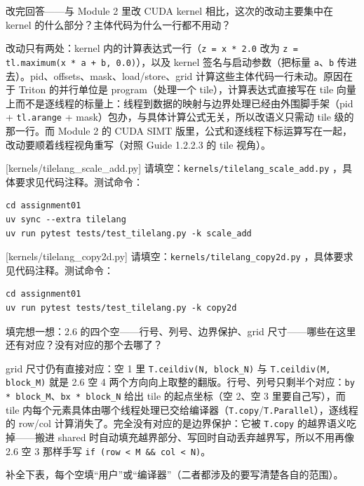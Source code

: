 \documentclass[11pt,a4paper,fontset=none]{ctexart}
\begin{document}
改完回答——与 Module 2 里改 CUDA kernel 相比，这次的改动主要集中在 kernel 的什么部分？主体代码为什么一行都不用动？

改动只有两处：kernel 内的计算表达式一行（\texttt{z = x * 2.0} 改为 \texttt{z = tl.maximum(x * a + b, 0.0)}），以及 kernel 签名与启动参数（把标量 \texttt{a}、\texttt{b} 传进去）。pid、offsets、mask、load/store、grid 计算这些主体代码一行未动。原因在于 Triton 的并行单位是 program（处理一个 tile），计算表达式直接写在 tile 向量上而不是逐线程的标量上：线程到数据的映射与边界处理已经由外围脚手架（pid + \texttt{tl.arange} + mask）包办，与具体计算公式无关，所以改语义只需动 tile 级的那一行。而 Module 2 的 CUDA SIMT 版里，公式和逐线程下标运算写在一起，改动要顺着线程视角重写（对照 Guide 1.2.2.3 的 tile 视角）。

[kernels/tilelang\_scale\_add.py]
请填空：\texttt{kernels/tilelang\_scale\_add.py} ，具体要求见代码注释。测试命令：

\begin{lstlisting}
cd assignment01
uv sync --extra tilelang
uv run pytest tests/test_tilelang.py -k scale_add
\end{lstlisting}

[kernels/tilelang\_copy2d.py]
请填空：\texttt{kernels/tilelang\_copy2d.py} ，具体要求见代码注释。测试命令：

\begin{lstlisting}
cd assignment01
uv run pytest tests/test_tilelang.py -k copy2d
\end{lstlisting}

填完想一想：2.6 的四个空——行号、列号、边界保护、grid 尺寸——哪些在这里还有对应？没有对应的那个去哪了？

grid 尺寸仍有直接对应：空 1 里 \texttt{T.ceildiv(N, block\_N)} 与 \texttt{T.ceildiv(M, block\_M)} 就是 2.6 空 4 两个方向向上取整的翻版。行号、列号只剩半个对应：\texttt{by * block\_M}、\texttt{bx * block\_N} 给出 tile 的起点坐标（空 2、空 3 里要自己写），而 tile 内每个元素具体由哪个线程处理已交给编译器（\texttt{T.copy}/\texttt{T.Parallel}），逐线程的 row/col 计算消失了。完全没有对应的是边界保护：它被 \texttt{T.copy} 的越界语义吃掉——搬进 shared 时自动填充越界部分、写回时自动丢弃越界写，所以不用再像 2.6 空 3 那样手写 \texttt{if (row < M \&\& col < N)}。

补全下表，每个空填“用户”或“编译器”（二者都涉及的要写清楚各自的范围）。
\end{document}

